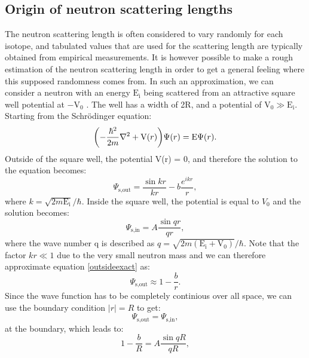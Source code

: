 \subsection{Origin of neutron scattering lengths}\label{neutronscatteringlengths}
The neutron scattering length is often considered to vary randomly for each isotope, and tabulated values that are used for the scattering length are typically obtained from empirical measurements. It is however possible to make a rough estimation of the neutron scattering length in order to get a general feeling where this supposed randomness comes from. In such an approximation, we can consider a neutron with an energy $\textrm{E}_\textrm{i}$ being scattered from an attractive square well potential at $-\textrm{V}_\textrm{0}$  \cite{hammouda}. The well has a width of 2R, and a potential of $\textrm{V}_\textrm{0} \gg \textrm{E}_\textrm{i}$. Starting from the Schrödinger equation:
\begin{equation}
	\qty(-\frac{\hbar^2}{2m} \nabla^2 + \textrm{V}(r))\Psi(r) = \textrm{E} \Psi(r). 
\end{equation}
Outside of the square well, the potential V(r) = 0, and therefore the solution to the equation becomes:
\begin{equation}\label{outsideexact}
	\Psi_{\textrm{s,out}} = \frac{\sin{k r}}{kr} - b \frac{e^{ikr}}{r},
\end{equation}
where $k = \sqrt{2m\textrm{E}_\textrm{i}} / \hbar$. Inside the square well, the potential is equal to $V_0$ and the solution becomes:
\begin{equation}
	\Psi_{\textrm{s,in}} = A\frac{\sin{qr}}{qr},
\end{equation}
where the wave number q is described as $q = \sqrt{2m(\textrm{E}_\textrm{i} + \textrm{V}_\textrm{0})} / \hbar$. Note that the factor $k r \ll 1$ due to the very small neutron mass and we can therefore approximate equation \ref{outsideexact} as:
\begin{equation}
	\Psi_{\textrm{s,out}} \approx 1 - \frac{b}{r}.
\end{equation}
Since the wave function has to be completely continious over all space, we can use the boundary condition $\vert r \vert = R$ to get:
\begin{equation}
	\Psi_{\textrm{s,out}} = \Psi_{\textrm{s,in}} ,
\end{equation}
at the boundary, which leads to:
\begin{equation}
	1 - \frac{b}{R} = A\frac{\sin{qR}}{qR},
\end{equation}
